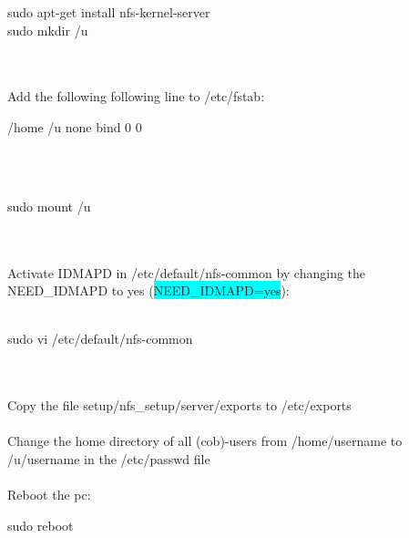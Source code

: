    \colorbox{light-gray}{
         \begin{minipage}{1.0\textwidth} 
	sudo apt-get install nfs-kernel-server \\
	sudo mkdir /u 
         \end{minipage} 
         } \\
\\ Add the following following line to /etc/fstab: \\
   \colorbox{light-gray}{
         \begin{minipage}{1.0\textwidth} 
		/home	/u	none	bind	0	0
         \end{minipage}  
         } \\
      \\   
   \colorbox{light-gray}{
         \begin{minipage}{1.0\textwidth} 
		sudo mount /u
         \end{minipage}  } \\
\\Activate IDMAPD in /etc/default/nfs-common by changing the NEED\_IDMAPD to yes (\colorbox{cyan}{NEED\_IDMAPD=yes}):\\
\\   \colorbox{light-gray}{
         \begin{minipage}{1.0\textwidth} 
		sudo vi /etc/default/nfs-common
         \end{minipage}  } \\
\\Copy the file setup/nfs\_setup/server/exports to /etc/exports\\
\\Change the home directory of all (cob)-users from /home/username to /u/username in the /etc/passwd file\\
\\Reboot the pc:
\\
   \colorbox{light-gray}{
         \begin{minipage}{1.0\textwidth} 
		sudo reboot
         \end{minipage}  } \\
\\
